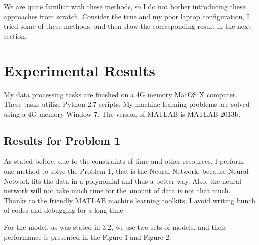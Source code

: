 \documentclass{sig-alternate}
\begin{document}
We are quite familiar with these methods, so I do not bother introducing these approaches from scratch. Consider the time and my poor laptop configuration, I tried some of these methods, and then show the corresponding result in the next section.




\section{Experimental Results}
My data processing tasks are finished on a 4G memory MacOS X computer. These tasks utilize Python 2.7 scripts. My machine learning problems are solved using a 4G memory Window 7. The version of MATLAB is MATLAB 2013b.

\subsection{Results for Problem 1}
As stated before, due to the constraints of time and other resources, I perform one method to solve the Problem 1, that is the Neural Network, because Neural Network fits the data in a polynomial and thus a better way. Also, the neural network will not take much time for the amount of data is not that much. Thanks to the friendly MATLAB machine learning toolkits\cite{nn}, I avoid writing bunch of codes and debugging for a long time.

For the model, as was stated in 3.2, we use two sets of models, and their performance is presented in the Figure 1 and Figure 2.
\end{document}
